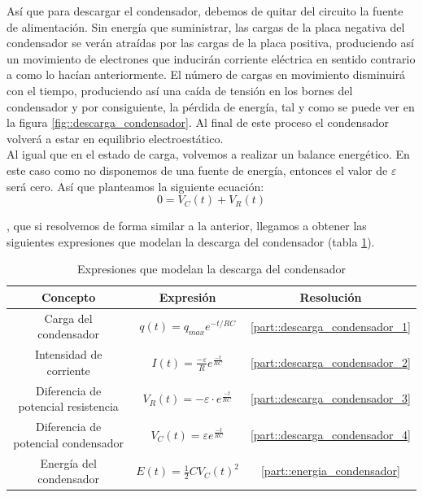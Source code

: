 \documentclass[../main.tex]{subfiles}
\begin{document}
Así que para descargar el condensador, debemos de quitar del circuito la fuente de alimentación. Sin energía que suministrar, las cargas de la placa negativa del condensador se verán atraídas por las cargas de la placa positiva, produciendo así un movimiento de electrones que inducirán corriente eléctrica en sentido contrario a como lo hacían anteriormente. El número de cargas en movimiento disminuirá con el tiempo, produciendo así una caída de tensión en los bornes del condensador y por consiguiente, la pérdida de energía, tal y como se puede ver en la figura \ref{fig::descarga_condensador}. Al final de este proceso el condensador volverá a estar en equilibrio electroestático. \\

Al igual que en el estado de carga, volvemos a realizar un balance energético. En este caso como no disponemos de una fuente de energía, entonces el valor de $\varepsilon$ será cero. Así que planteamos la siguiente ecuación:
\begin{equation}
    0 = V_C(t) + V_R(t)
    \label{eqq::balance_energetico_rc_2}
\end{equation}

, que si resolvemos de forma similar a la anterior, llegamos a obtener las siguientes expresiones que modelan la descarga del condensador (tabla \ref{tab::ecuaciones_descarga_rc}).\\

\begin{table}[!ht]
        \begin{center}
            \begin{tabular}{|| c | c | c ||}
                \hline
                \textbf{Concepto} & \textbf{Expresión} &  \textbf{Resolución}\\ \hline
                Carga del condensador & $q(t) = q_{max} e^{-t/{RC}}$ & \ref{part::descarga_condensador_1} \\
                Intensidad de corriente & $I(t) = \frac{-\varepsilon}{R}e^{\frac{-t}{RC}}$ & \ref{part::descarga_condensador_2} \\
                Diferencia de potencial resistencia & $V_R(t) = -\varepsilon \cdot e^{\frac{-t}{RC}}$ & \ref{part::descarga_condensador_3} \\ 
                Diferencia de potencial condensador & $V_C(t) = \varepsilon   e^{\frac{-t}{RC}}$ & \ref{part::descarga_condensador_4} \\ 
                Energía del condensador & $E(t) = \frac{1}{2}CV_C(t)^2 $ & \ref{part::energia_condensador} \\
                \hline
                \end{tabular}
                \caption{Expresiones que modelan la descarga del condensador}
                \label{tab::ecuaciones_descarga_rc}
        \end{center}
    \end{table}
    
\end{document}
